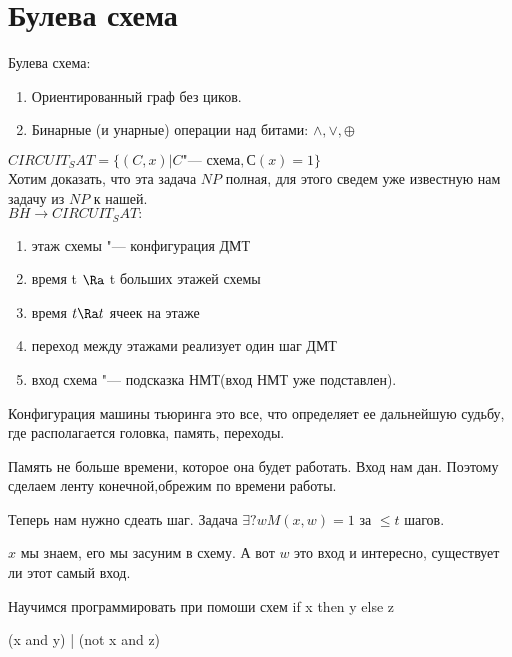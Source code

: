 \section{Булева схема}
\begin{Def}
Булева схема:
\begin{enumerate}
\item Ориентированный граф без циков.
\item Бинарные (и унарные) операции над битами: $\wedge, \vee, \oplus$
\end{enumerate} 
\end{Def}
\begin{exmp}

\end{exmp}

$CIRCUIT_SAT = \{(C, x)|C \text{"--- схема}, С(x) = 1\}$\\
Хотим доказать, что эта задача $NP$ полная, для 
этого сведем уже известную нам задачу из $NP$ к 
нашей.              \\
$BH \to CIRCUIT_SAT:$
\begin{enumerate}
\item этаж схемы "--- конфигурация ДМТ\\
\item время t $\Ra$ t больших этажей схемы
\item время $t \Ra t$ ячеек на этаже\\
\item переход между этажами реализует один шаг ДМТ
\item вход схема "--- подсказка НМТ(вход НМТ уже подставлен).
\end{enumerate}

\begin{Def}
Конфигурация машины тьюринга это все, что 
определяет ее дальнейшую судьбу, где располагается головка, 
память, переходы. 
\end{Def}

Память не больше времени, которое она будет работать. Вход 
нам дан. Поэтому сделаем ленту конечной,обрежим по времени работы. 

Теперь нам нужно сдеать шаг. 
Задача $\exists ? w M(x, w) = 1$ за $\le t$ шагов. 

$x$ мы знаем, его мы засуним в схему. А вот $w$ это вход и интересно,
существует ли этот самый вход. 

Научимся программировать при помоши схем 
if x then y else z

(x and y)  |  (not x and z)

